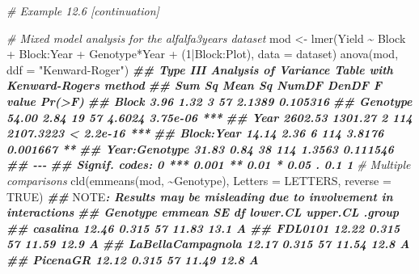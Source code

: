 \documentclass[
  12pt,
]{book}
\newenvironment{Shaded}{\begin{snugshade}}{\end{snugshade}}
\newcommand{\AlertTok}[1]{\textcolor[rgb]{0.94,0.16,0.16}{#1}}
\newcommand{\AttributeTok}[1]{\textcolor[rgb]{0.77,0.63,0.00}{#1}}
\newcommand{\CommentTok}[1]{\textcolor[rgb]{0.56,0.35,0.01}{\textit{#1}}}
\newcommand{\ConstantTok}[1]{\textcolor[rgb]{0.00,0.00,0.00}{#1}}
\newcommand{\DecValTok}[1]{\textcolor[rgb]{0.00,0.00,0.81}{#1}}
\newcommand{\DocumentationTok}[1]{\textcolor[rgb]{0.56,0.35,0.01}{\textbf{\textit{#1}}}}
\newcommand{\FunctionTok}[1]{\textcolor[rgb]{0.00,0.00,0.00}{#1}}
\newcommand{\NormalTok}[1]{#1}
\newcommand{\OtherTok}[1]{\textcolor[rgb]{0.56,0.35,0.01}{#1}}
\newcommand{\SpecialCharTok}[1]{\textcolor[rgb]{0.00,0.00,0.00}{#1}}
\newcommand{\StringTok}[1]{\textcolor[rgb]{0.31,0.60,0.02}{#1}}
\begin{document}
\begin{Shaded}
\begin{Highlighting}[]
\CommentTok{\# Example 12.6 [continuation]}

\CommentTok{\# Mixed model analysis for the \textquotesingle{}alfalfa3years\textquotesingle{} dataset}
\NormalTok{mod }\OtherTok{\textless{}{-}} \FunctionTok{lmer}\NormalTok{(Yield }\SpecialCharTok{\textasciitilde{}}\NormalTok{ Block }\SpecialCharTok{+}\NormalTok{ Block}\SpecialCharTok{:}\NormalTok{Year }\SpecialCharTok{+}\NormalTok{ Genotype}\SpecialCharTok{*}\NormalTok{Year }\SpecialCharTok{+}
\NormalTok{            (}\DecValTok{1}\SpecialCharTok{|}\NormalTok{Block}\SpecialCharTok{:}\NormalTok{Plot),}
           \AttributeTok{data =}\NormalTok{ dataset)}
\FunctionTok{anova}\NormalTok{(mod, }\AttributeTok{ddf =} \StringTok{"Kenward{-}Roger"}\NormalTok{)}
\DocumentationTok{\#\# Type III Analysis of Variance Table with Kenward{-}Roger\textquotesingle{}s method}
\DocumentationTok{\#\#                Sum Sq Mean Sq NumDF DenDF   F value    Pr(\textgreater{}F)    }
\DocumentationTok{\#\# Block            3.96    1.32     3    57    2.1389  0.105316    }
\DocumentationTok{\#\# Genotype        54.00    2.84    19    57    4.6024  3.75e{-}06 ***}
\DocumentationTok{\#\# Year          2602.53 1301.27     2   114 2107.3223 \textless{} 2.2e{-}16 ***}
\DocumentationTok{\#\# Block:Year      14.14    2.36     6   114    3.8176  0.001667 ** }
\DocumentationTok{\#\# Year:Genotype   31.83    0.84    38   114    1.3563  0.111546    }
\DocumentationTok{\#\# {-}{-}{-}}
\DocumentationTok{\#\# Signif. codes:  0 \textquotesingle{}***\textquotesingle{} 0.001 \textquotesingle{}**\textquotesingle{} 0.01 \textquotesingle{}*\textquotesingle{} 0.05 \textquotesingle{}.\textquotesingle{} 0.1 \textquotesingle{} \textquotesingle{} 1}
\CommentTok{\# Multiple comparisons}
\FunctionTok{cld}\NormalTok{(}\FunctionTok{emmeans}\NormalTok{(mod, }\SpecialCharTok{\textasciitilde{}}\NormalTok{Genotype), }\AttributeTok{Letters =}\NormalTok{ LETTERS, }\AttributeTok{reverse =} \ConstantTok{TRUE}\NormalTok{)}
\DocumentationTok{\#\# }\AlertTok{NOTE}\DocumentationTok{: Results may be misleading due to involvement in interactions}
\DocumentationTok{\#\#  Genotype          emmean    SE df lower.CL upper.CL .group}
\DocumentationTok{\#\#  casalina           12.46 0.315 57    11.83     13.1  A    }
\DocumentationTok{\#\#  FDL0101            12.22 0.315 57    11.59     12.9  A    }
\DocumentationTok{\#\#  LaBellaCampagnola  12.17 0.315 57    11.54     12.8  A    }
\DocumentationTok{\#\#  PicenaGR           12.12 0.315 57    11.49     12.8  A    }

\end{Highlighting}
\end{Shaded}
\end{document}

